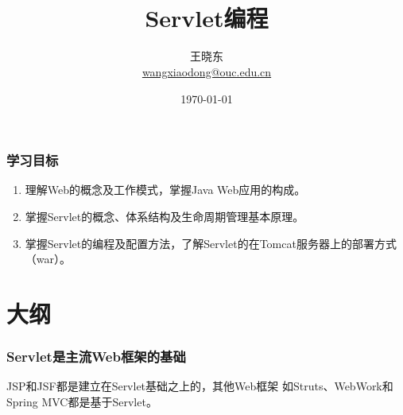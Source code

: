 
\title[KevinW@OUC]{\\  
 Servlet编程}
\author[王晓东]{王晓东\\
  \href{mailto:wangxiaodong@ouc.edu.cn}{\footnotesize wangxiaodong@ouc.edu.cn}}
\date{\today}



\frame{\titlepage}
\begin{frame}
  \frametitle{学习目标}

  \begin{enumerate}
  \item 理解Web的概念及工作模式，掌握Java Web应用的构成。
  \item 掌握Servlet的概念、体系结构及生命周期管理基本原理。
  \item 掌握Servlet的编程及配置方法，了解Servlet的在Tomcat服务器上的部署方式（war）。
  \end{enumerate}  
\end{frame}
\section*{大纲}

\begin{frame}[fragile]
  \frametitle{Servlet是主流Web框架的基础} 

  JSP和JSF都是建立在Servlet基础之上的，其他Web框架
  如Struts、WebWork和Spring MVC都是基于Servlet。
\end{frame}

